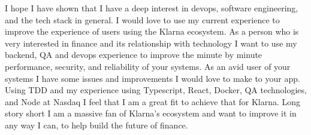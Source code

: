 \documentclass[../../main.tex]{subfiles}
\begin{document}
I hope I have shown that I have a deep interest in devops, software engineering, and the tech stack in general. I would love to use my current experience to improve the experience of users using the Klarna ecosystem. As a person who is very interested in finance and its relationship with technology I want to use  my backend, QA and devops experience to improve the minute by minute performance, security, and reliability of your systems. As an avid user of your systems I have some issues and improvements I would love to make to your app.  Using TDD and my experience using Typescript, React, Docker, QA technologies, and Node at Nasdaq I feel that I am a great fit to achieve that for Klarna.
Long story short I am a massive fan of Klarna's ecosystem and want to improve it in any way I can, to help build the future of finance.
\\
\end{document}
